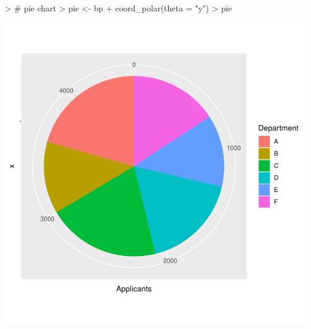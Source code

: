\documentclass[12pt,letterpaper,final]{article}
\begin{document}
\begin{Schunk}
\begin{Sinput}
> # pie chart
> pie <- bp + coord_polar(theta = "y")
> pie
\end{Sinput}
\end{Schunk}
\includegraphics{lect_main-009}
\end{document}
